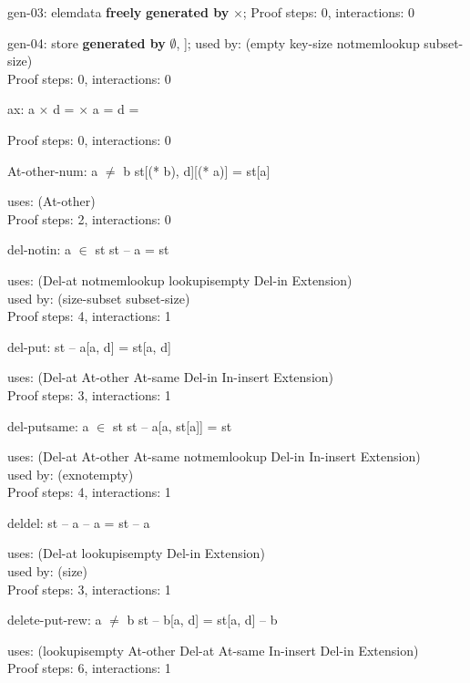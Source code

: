 \documentclass[a4paper]{article}
\begin{document}
gen-03: elemdata {\bf freely}  {\bf generated by} $\times$;
Proof steps: 0, interactions: 0

\medskip

gen-04: store  {\bf generated by} $\emptyset$, ];
used by: (empty key-size notmemlookup subset-size)\\
Proof steps: 0, interactions: 0

\medskip

ax: 
 \Fol a $\times$ d =  $\times$  \Equiv a =  \And d = 


Proof steps: 0, interactions: 0

\medskip

At-other-num: 
a $\neq$ b
 \Fol st[(* b), d][(* a)] = st[a]


uses: (At-other)\\
Proof steps: 2, interactions: 0

\medskip

del-notin: 
 \Fol \Not a $\in$ st \Imp st -- a = st


uses: (Del-at notmemlookup lookupisempty Del-in Extension)\\
used by: (size-subset subset-size)\\
Proof steps: 4, interactions: 1

\medskip

del-put: 
 \Fol st -- a[a, d] = st[a, d]


uses: (Del-at At-other At-same Del-in In-insert Extension)\\
Proof steps: 3, interactions: 1

\medskip

del-putsame: 
 \Fol a $\in$ st \Imp st -- a[a, st[a]] = st


uses: (Del-at At-other At-same notmemlookup Del-in In-insert
       Extension)\\
used by: (exnotempty)\\
Proof steps: 4, interactions: 1

\medskip

deldel: 
 \Fol st -- a -- a = st -- a


uses: (Del-at lookupisempty Del-in Extension)\\
used by: (size)\\
Proof steps: 3, interactions: 1

\medskip

delete-put-rew: 
 \Fol a $\neq$ b \Imp st -- b[a, d] = st[a, d] -- b


uses: (lookupisempty At-other Del-at At-same In-insert Del-in
       Extension)\\
Proof steps: 6, interactions: 1
\end{document}

